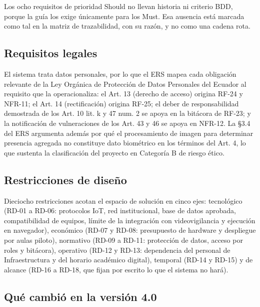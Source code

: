 Los ocho requisitos de prioridad Should no llevan historia ni criterio BDD, porque la gu\'ia los exige \'unicamente para los Must. Esa ausencia est\'a marcada como tal en la matriz de trazabilidad, con su raz\'on, y no como una cadena rota.

\subsection{Requisitos legales}

El sistema trata datos personales, por lo que el ERS mapea cada obligaci\'on relevante de la Ley Org\'anica de Protecci\'on de Datos Personales del Ecuador \cite{asamblea2021lopdp} al requisito que la operacionaliza: el Art. 13 (derecho de acceso) origina RF-24 y NFR-11; el Art. 14 (rectificaci\'on) origina RF-25; el deber de responsabilidad demostrada de los Art. 10 lit. k y 47 num. 2 se apoya en la bit\'acora de RF-23; y la notificaci\'on de vulneraciones de los Art. 43 y 46 se apoya en NFR-12. La \S3.4 del ERS argumenta adem\'as por qu\'e el procesamiento de imagen para determinar presencia agregada no constituye dato biom\'etrico en los t\'erminos del Art. 4, lo que sustenta la clasificaci\'on del proyecto en Categor\'ia B de riesgo \'etico.

\subsection{Restricciones de dise\~no}

Dieciocho restricciones acotan el espacio de soluci\'on en cinco ejes: tecnol\'ogico (RD-01 a RD-06: protocolos IoT, red institucional, base de datos aprobada, compatibilidad de equipos, l\'imite de la integraci\'on con videovigilancia y ejecuci\'on en navegador), econ\'omico (RD-07 y RD-08: presupuesto de hardware y despliegue por aulas piloto), normativo (RD-09 a RD-11: protecci\'on de datos, acceso por roles y bit\'acora), operativo (RD-12 y RD-13: dependencia del personal de Infraestructura y del horario acad\'emico digital), temporal (RD-14 y RD-15) y de alcance (RD-16 a RD-18, que fijan por escrito lo que el sistema no har\'a).

\subsection{Qu\'e cambi\'o en la versi\'on 4.0}

